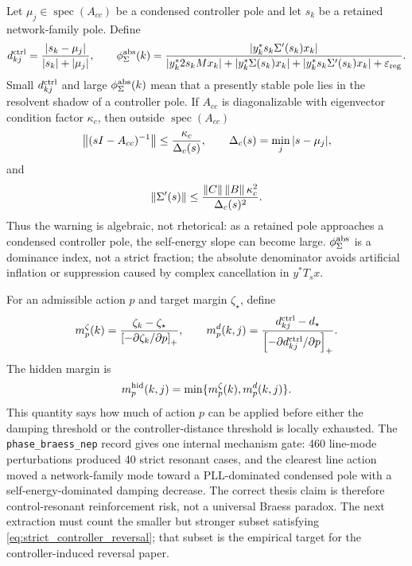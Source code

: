 Let \(\mu_j\in\operatorname{spec}(A_{cc})\) be a condensed controller pole and
let \(s_k\) be a retained network-family pole. Define
\begin{equation}
  d^{\rm ctrl}_{kj}
  =
  \frac{|s_k-\mu_j|}{|s_k|+|\mu_j|},
  \qquad
  \phi_\Sigma^{\rm abs}(k)
  =
  \frac{|y_k^*s_k\Sigma'(s_k)x_k|}
  {|y_k^*2s_kMx_k|+
   |y_k^*\Sigma(s_k)x_k|+
   |y_k^*s_k\Sigma'(s_k)x_k|+
   \varepsilon_{\rm reg}}.
  \label{eq:hidden_ctrl_metrics}
\end{equation}
Small \(d^{\rm ctrl}_{kj}\) and large \(\phi_\Sigma^{\rm abs}(k)\) mean that a presently
stable pole lies in the resolvent shadow of a controller pole. If \(A_{cc}\) is
diagonalizable with eigenvector condition factor \(\kappa_c\), then outside
\(\operatorname{spec}(A_{cc})\)
\begin{equation}
  \left\lVert (sI-A_{cc})^{-1} \right\rVert
  \le
  \frac{\kappa_c}{\Delta_c(s)},
  \qquad
  \Delta_c(s)=\min_j |s-\mu_j|,
  \label{eq:resolvent_bound}
\end{equation}
and
\begin{equation}
  \left\lVert \Sigma'(s) \right\rVert
  \le
  \frac{\left\lVert C \right\rVert\left\lVert B \right\rVert\kappa_c^2}{\Delta_c(s)^2}.
  \label{eq:sigma_prime_bound}
\end{equation}
Thus the warning is algebraic, not rhetorical: as a retained pole approaches a
condensed controller pole, the self-energy slope can become large.
\(\phi_\Sigma^{\rm abs}\) is a dominance index, not a strict fraction; the
absolute denominator avoids artificial inflation or suppression caused by
complex cancellation in \(y^*T_sx\).

For an admissible action \(p\) and target margin \(\zeta_\star\), define
\begin{equation}
  m_p^\zeta(k)
  =
  \frac{\zeta_k-\zeta_\star}
       {\left[-\partial\zeta_k/\partial p\right]_+},
  \qquad
  m_p^d(k,j)
  =
  \frac{d^{\rm ctrl}_{kj}-d_\star}
       {\left[-\partial d^{\rm ctrl}_{kj}/\partial p\right]_+}.
  \label{eq:hidden_action_margins}
\end{equation}
The hidden margin is
\begin{equation}
  m_p^{\rm hid}(k,j)=\min\{m_p^\zeta(k),m_p^d(k,j)\}.
  \label{eq:hidden_margin}
\end{equation}
This quantity says how much of action \(p\) can be applied before either the
damping threshold or the controller-distance threshold is locally exhausted.
The \texttt{phase\_braess\_nep} record gives one internal mechanism gate: 460
line-mode perturbations produced 40 strict resonant cases, and the clearest
line action moved a network-family mode toward a PLL-dominated condensed pole
with a self-energy-dominated damping decrease. The correct thesis claim is
therefore control-resonant reinforcement risk, not a universal Braess paradox.
The next extraction must count the smaller but stronger subset satisfying
\eqref{eq:strict_controller_reversal}; that subset is the empirical target for
the controller-induced reversal paper.

